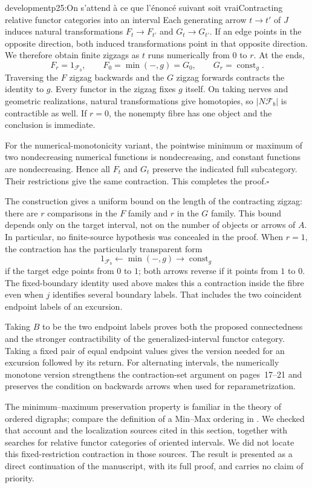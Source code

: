 \begin{dcomment}{development}{p25:On s'attend à ce que l'énoncé suivant soit vrai}{Contracting relative functor categories into an interval}
Each generating arrow $t\to t'$ of $J$ induces natural transformations $F_t\to F_{t'}$ and $G_t\to G_{t'}$. If an edge points in the opposite direction, both induced transformations point in that opposite direction. We therefore obtain finite zigzags as $t$ runs numerically from $0$ to $r$. At the ends,
\[
 F_r=1_{\mathcal F_b},\qquad
 F_0=\min(-,g)=G_0,\qquad
 G_r=\operatorname{const}_g.
\]
Traversing the $F$ zigzag backwards and the $G$ zigzag forwards contracts the identity to $g$. Every functor in the zigzag fixes $g$ itself. On taking nerves and geometric realizations, natural transformations give homotopies, so $|N\mathcal F_b|$ is contractible as well. If $r=0$, the nonempty fibre has one object and the conclusion is immediate.

For the numerical-monotonicity variant, the pointwise minimum or maximum of two nondecreasing numerical functions is nondecreasing, and constant functions are nondecreasing. Hence all $F_t$ and $G_t$ preserve the indicated full subcategory. Their restrictions give the same contraction. This completes the proof.\hfill$\square$

The construction gives a uniform bound on the length of the contracting zigzag: there are $r$ comparisons in the $F$ family and $r$ in the $G$ family. This bound depends only on the target interval, not on the number of objects or arrows of $A$. In particular, no finite-source hypothesis was concealed in the proof. When $r=1$, the contraction has the particularly transparent form
\[
 1_{\mathcal F_b}\longleftarrow\min(-,g)
       \longrightarrow\operatorname{const}_g
\]
if the target edge points from $0$ to $1$; both arrows reverse if it points from $1$ to $0$. The fixed-boundary identity used above makes this a contraction inside the fibre even when $j$ identifies several boundary labels. That includes the two coincident endpoint labels of an excursion.

Taking $B$ to be the two endpoint labels proves both the proposed connectedness and the stronger contractibility of the generalized-interval functor category. Taking a fixed pair of equal endpoint values gives the version needed for an excursion followed by its return. For alternating intervals, the numerically monotone version strengthens the contraction-set argument on pages~17--21 and preserves the condition on backwards arrows when used for reparametrization.

The minimum--maximum preservation property is familiar in the theory of ordered digraphs; compare the definition of a Min--Max ordering in \citet[p.~1577]{HellRafiey2012}. We checked that account and the localization sources cited in this section, together with searches for relative functor categories of oriented intervals. We did not locate this fixed-restriction contraction in those sources. The result is presented as a direct continuation of the manuscript, with its full proof, and carries no claim of priority.
\end{dcomment}

